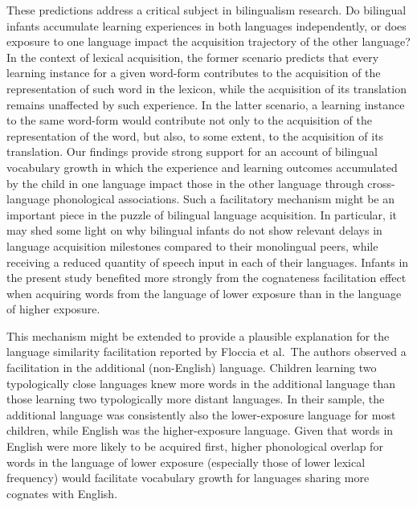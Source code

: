 \documentclass[
  12pt,
  b5paperpaper,
  twoside]{scrreprt}
\begin{document}
These predictions address a critical subject in bilingualism research.
Do bilingual infants accumulate learning experiences in both languages
independently, or does exposure to one language impact the acquisition
trajectory of the other language? In the context of lexical acquisition,
the former scenario predicts that every learning instance for a given
word-form contributes to the acquisition of the representation of such
word in the lexicon, while the acquisition of its translation remains
unaffected by such experience. In the latter scenario, a learning
instance to the same word-form would contribute not only to the
acquisition of the representation of the word, but also, to some extent,
to the acquisition of its translation. Our findings provide strong
support for an account of bilingual vocabulary growth in which the
experience and learning outcomes accumulated by the child in one
language impact those in the other language through cross-language
phonological associations. Such a facilitatory mechanism might be an
important piece in the puzzle of bilingual language acquisition. In
particular, it may shed some light on why bilingual infants do not show
relevant delays in language acquisition milestones compared to their
monolingual peers, while receiving a reduced quantity of speech input in
each of their languages. Infants in the present study benefited more
strongly from the cognateness facilitation effect when acquiring words
from the language of lower exposure than in the language of higher
exposure.

This mechanism might be extended to provide a plausible explanation for
the language similarity facilitation reported by Floccia et al.~The
authors observed a facilitation in the additional (non-English)
language. Children learning two typologically close languages knew more
words in the additional language than those learning two typologically
more distant languages. In their sample, the additional language was
consistently also the lower-exposure language for most children, while
English was the higher-exposure language. Given that words in English
were more likely to be acquired first, higher phonological overlap for
words in the language of lower exposure (especially those of lower
lexical frequency) would facilitate vocabulary growth for languages
sharing more cognates with English.
\end{document}
